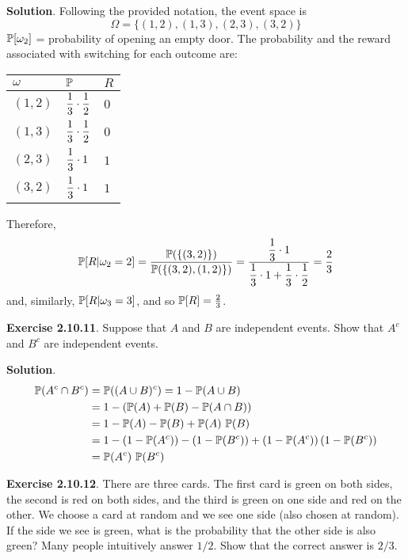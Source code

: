 \textbf{Solution}. Following the provided notation, the event space is
\[
\Omega = \{ (1, 2), (1, 3), (2, 3), (3, 2) \} 
\]
\(\operatorname{\mathbb{P}}[ \omega_{2}]\) = probability of opening an empty door. The
probability and the reward associated with switching for each outcome
are:
\begin{table}[H]
\centering
\begin{tabular}{@{}p{2cm}p{2cm}p{2cm} @{}}
\toprule
\(\omega\) & \(\operatorname{\mathbb{P}}\) & \(R\) 
\\
\midrule
\((1, 2)\) & \(\displaystyle\frac{1}{3}\cdot\frac{1}{2}\) & \(0\) 
\\[
2ex]
\((1, 3)\) & \(\displaystyle\frac{1}{3}\cdot\frac{1}{2}\) & \(0\) 
\\[
2ex]
\((2, 3)\) & \(\displaystyle\frac{1}{3}\cdot1\) & \(1\) 
\\[
2ex]
\((3, 2)\) & \(\displaystyle\frac{1}{3}\cdot1\) & \(1\) 
\\
\bottomrule
\end{tabular}
\end{table}
Therefore,
\[
\operatorname{\mathbb{P}}[ R | \omega_{2} = 2 ] = \frac{\operatorname{\mathbb{P}}(\{(3, 2)\})}{\operatorname{\mathbb{P}}(\{ (3, 2), (1, 2) \})}= \frac{\displaystyle\frac{1}{3} \cdot 1}{\displaystyle\frac{1}{3} \cdot 1 + \frac{1}{3} \cdot \frac{1}{2}} = \frac{2}{3}
\]
and, similarly, \(\operatorname{\mathbb{P}}[ R | \omega_{3} = 3 ]\), and so
\(\operatorname{\mathbb{P}}[R] = \frac{2}{3}\).

\textbf{Exercise 2.10.11}. Suppose that \(A\) and \(B\) are independent
events. Show that \(A^{c}\) and \(B^{c}\) are independent events.

\textbf{Solution}.
\begin{align*}
\PROB(A^{c} \inter B^{c}) 
&= \PROB((A \union B)^{c})  = 1 - \PROB(A \union B) 
\\
&= 1 - \left( \PROB(A) + \PROB(B) - \PROB(A \inter B) \right)  
\\
&= 1 - \PROB(A) - \PROB(B) + \PROB(A) \, \PROB(B) 
\\
&= 1 - (1 - \PROB(A^{c})) 
     - (1 - \PROB(B^{c})) 
     + (1 - \PROB(A^{c})) \, (1 - \PROB(B^{c})) 
\\
&= \PROB(A^{c}) \, \PROB(B^{c})
\end{align*}

\textbf{Exercise 2.10.12}. There are three cards. The first card is
green on both sides, the second is red on both sides, and the third is
green on one side and red on the other. We choose a card at random and
we see one side (also chosen at random). If the side we see is green,
what is the probability that the other side is also green? Many people
intuitively answer $1/2$. Show that the correct answer is $2/3$.

